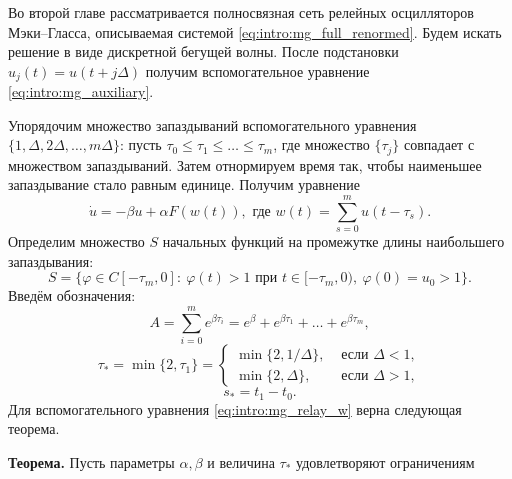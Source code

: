 \bigskip
Во второй главе рассматривается полносвязная сеть релейных осцилляторов Мэки--Гласса, описываемая системой \eqref{eq:intro:mg_full_renormed}. Будем искать решение в виде дискретной бегущей волны. После подстановки $u_j(t) = u(t + j\Delta)$ получим вспомогательное уравнение \eqref{eq:intro:mg_auxiliary}.

Упорядочим множество запаздываний вспомогательного уравнения $\{1, \Delta, 2\Delta, \ldots, m\Delta\}$: пусть $\tau_0 \leq \tau_1 \leq \ldots \leq \tau_m$, где множество $\{\tau_j\}$ совпадает с множеством запаздываний. Затем отнормируем время так, чтобы наименьшее запаздывание стало равным единице. Получим уравнение 
\begin{equation}
	\label{eq:intro:mg_relay_w}
	\dot{u}=-\beta u+\alpha F(w(t)), \text{ где } w(t) = \sum\limits_{s = 0}^m u(t - \tau_s).
\end{equation}
%
Определим множество $S$ начальных функций на промежутке длины наибольшего запаздывания: 
%
\begin{equation}
	\label{eq:intro:mg_init_set}
	S = \{\varphi\in C[-\tau_{m},0]:\  \varphi(t)>1 \text{ при } t\in[-\tau_{m},0),\ \varphi(0)=u_0 > 1\}.
\end{equation}
%
Введём обозначения:
%
\begin{equation*}
	A = \sum_{i=0}^{m}e^{\beta \tau_{i}}=e^\beta+e^{\beta \tau_1}+\ldots+e^{\beta \tau_{m}},
\end{equation*}
\begin{equation*}
	\tau_* = \min\{2,\tau_1\}=\left\lbrace\begin{array}{cl}
		\min\{2,1/\Delta\}, & \text{ если } \Delta < 1,
		\\
		\min\{2,\Delta\}, & \text{ если } \Delta > 1,
	\end{array}\right.
\end{equation*}
\begin{equation*}
	s_* = t_1-t_0.
\end{equation*}
%
Для вспомогательного уравнения \eqref{eq:intro:mg_relay_w} верна следующая теорема.

\textbf{Теорема.} Пусть параметры $\alpha, \beta$ и величина $\tau_*$ удовлетворяют ограничениям

